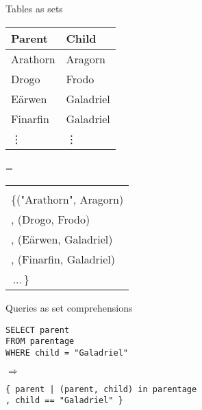 \documentclass[xcolor=table,usenames,dvipsnames,svgnames]{beamer}
\newcommand{\df}{\color{RoyalBlue}}
\begin{document}

\begin{frame}{Tables as sets}\large
  \begin{minipage}{0.4\textwidth}
    \centering
    \begin{tabular}{l|l}
      \textbf{Parent} & \textbf{Child}\\\hline
      Arathorn & Aragorn\\
      Drogo & Frodo\\
      E\"arwen & Galadriel\\
      Finarfin & Galadriel\\
      \rowcolor{white}
      \hfill\vdots & \hfill\vdots
    \end{tabular}


  \end{minipage}
  \hfill{\LARGE =}\hfill
  \begin{minipage}{0.51\textwidth}
    \centering

    \begin{tabular}{l}
      \color{gray}{// set of (parent, child) pairs}\\
      \{\hspace{1pt}("Arathorn", Aragorn)\\
      , (Drogo, Frodo)\\
      , (E\"arwen, Galadriel)\\
      , (Finarfin, Galadriel)\\
      \,...\,\} \phantom{\vdots}
    \end{tabular}

  \end{minipage}

\end{frame}


\begin{frame}{Queries as set comprehensions}\Large\centering
  \begin{minipage}{0.7\textwidth}
    \texttt{SELECT parent\\FROM parentage\\WHERE child = "Galadriel"}
  \end{minipage}

  \vspace{1.5em}
  {\LARGE $\Longrightarrow$}
  \vspace{1em}

  \begin{minipage}{1.0\textwidth}
    \Large
    \df \tt \{ parent | (parent, child) in parentage\\
    , child == "Galadriel" \}
  \end{minipage}

\end{frame}
\end{document}
